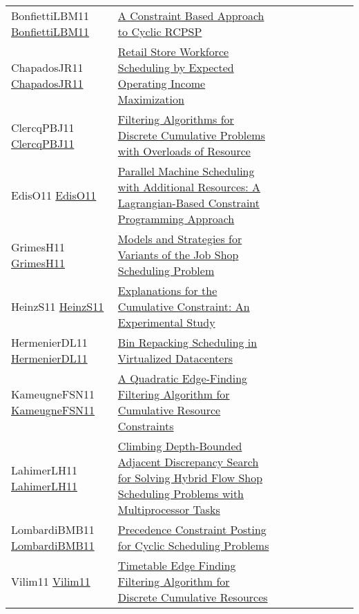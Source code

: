 {\begin{longtable}{p{3cm}p{7cm}lllllll}
BonfiettiLBM11 \href{https://doi.org/10.1007/978-3-642-23786-7\_12}{BonfiettiLBM11} &  \href{papers/BonfiettiLBM11.pdf}{A Constraint Based Approach to Cyclic {RCPSP}} &  &  &  &  &  &  & \\
ChapadosJR11 \href{https://doi.org/10.1007/978-3-642-21311-3\_7}{ChapadosJR11} &  \href{papers/ChapadosJR11.pdf}{Retail Store Workforce Scheduling by Expected Operating Income Maximization} &  &  &  &  &  &  & \\
ClercqPBJ11 \href{https://doi.org/10.1007/978-3-642-23786-7\_20}{ClercqPBJ11} &  \href{papers/ClercqPBJ11.pdf}{Filtering Algorithms for Discrete Cumulative Problems with Overloads of Resource} &  &  &  &  &  &  & \\
EdisO11 \href{https://doi.org/10.1007/978-3-642-21311-3\_10}{EdisO11} &  \href{papers/EdisO11.pdf}{Parallel Machine Scheduling with Additional Resources: {A} Lagrangian-Based Constraint Programming Approach} &  &  &  &  &  &  & \\
GrimesH11 \href{https://doi.org/10.1007/978-3-642-23786-7\_28}{GrimesH11} &  \href{papers/GrimesH11.pdf}{Models and Strategies for Variants of the Job Shop Scheduling Problem} &  &  &  &  &  &  & \\
HeinzS11 \href{https://doi.org/10.1007/978-3-642-20662-7\_34}{HeinzS11} &  \href{papers/HeinzS11.pdf}{Explanations for the Cumulative Constraint: An Experimental Study} &  &  &  &  &  &  & \\
HermenierDL11 \href{https://doi.org/10.1007/978-3-642-23786-7\_5}{HermenierDL11} &  \href{papers/HermenierDL11.pdf}{Bin Repacking Scheduling in Virtualized Datacenters} &  &  &  &  &  &  & \\
KameugneFSN11 \href{https://doi.org/10.1007/978-3-642-23786-7\_37}{KameugneFSN11} &  \href{papers/KameugneFSN11.pdf}{A Quadratic Edge-Finding Filtering Algorithm for Cumulative Resource Constraints} &  &  &  &  &  &  & \\
LahimerLH11 \href{https://doi.org/10.1007/978-3-642-21311-3\_12}{LahimerLH11} &  \href{papers/LahimerLH11.pdf}{Climbing Depth-Bounded Adjacent Discrepancy Search for Solving Hybrid Flow Shop Scheduling Problems with Multiprocessor Tasks} &  &  &  &  &  &  & \\
LombardiBMB11 \href{https://doi.org/10.1007/978-3-642-21311-3\_14}{LombardiBMB11} &  \href{papers/LombardiBMB11.pdf}{Precedence Constraint Posting for Cyclic Scheduling Problems} &  &  &  &  &  &  & \\
Vilim11 \href{https://doi.org/10.1007/978-3-642-21311-3\_22}{Vilim11} &  \href{papers/Vilim11.pdf}{Timetable Edge Finding Filtering Algorithm for Discrete Cumulative Resources} &  &  &  &  &  &  & \\

\end{longtable}}
